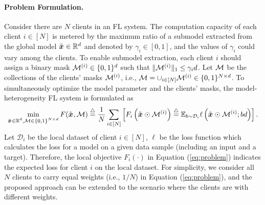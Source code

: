 \documentclass{article}
\theoremstyle{plain}
\theoremstyle{definition}
\theoremstyle{remark}
\newcommand{\E}{\mathbb{E}}
\renewcommand{\eqref}[1]{Equation (\ref{#1})}
\newcommand{\defeq}{\overset{\triangle}{=}}
\newcommand{\bracket}[1]{\left(#1\right)}
\begin{document}
\paragraph{Problem Formulation.} Consider there are $N$ clients in an FL system. The computation capacity of each client $i \in [N]$ is metered by the maximum ratio of a submodel extracted from the global model $\x{} \in \mathbb{R}^d$ and denoted by $\gamma_i \in [0, 1]$, and the values of $\gamma_i$ could vary among the clients. To enable submodel extraction, each client $i$ should assign a binary mask $\mask{i} \in \{0, 1\}^d$ such that $\|\mask{i}\|_1 \leq \gamma_i d$. Let $\mask$ be the collections of the clients' masks $\mask{i}$, i.e., $\mask = \cup_{i \in [N]} \mask{i} \in \{0, 1\}^{N \times d}$. To simultaneously optimize the model parameter and the clients' masks, the model-heterogeneity FL system is formulated as
\begin{equation} \label{eq:problem}
    \min_{\substack{\x{} \in \mathbb{R}^d, \mask \in  \{0, 1\}^{N \times d}}} F(\x{}, \mask) \defeq \frac{1}{N} \sum_{i \in [N]} \left[F_i \bracket{\x{} \odot \mask{i}} \defeq \E_{b \sim \mathcal{D}_i} \ell\bracket{\x{} \odot \mask{i}; bd} \right]. 
\end{equation}
Let $\mathcal{D}_i$ be the local dataset of client $i \in [N]$, $\ell$ be the loss function which calculates the loss for a model on a given data sample (including an input and a target). Therefore, the local objective $F_i(\cdot)$ in \eqref{eq:problem} indicates the expected loss for client $i$ on the local dataset. For simplicity, we consider all $N$ clients to carry equal weights (i.e., $1/N$) in \eqref{eq:problem}, and the proposed approach can be extended to the scenario where the clients are with different weights. 
\end{document}
